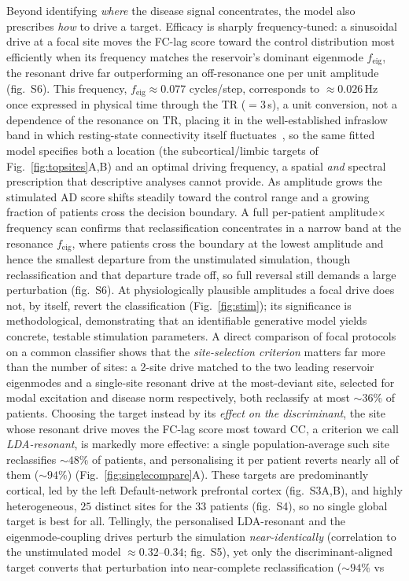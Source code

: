 \documentclass[11pt]{article}
\begin{document}
Beyond identifying \emph{where} the disease signal concentrates, the model also
prescribes \emph{how} to drive a target. Efficacy is sharply frequency-tuned: a
sinusoidal drive at a focal site moves the FC-lag score toward the control
distribution most efficiently when its frequency matches the reservoir's dominant
eigenmode $f_{\mathrm{eig}}$, the resonant drive far outperforming an off-resonance
one per unit amplitude (fig.~S6). This frequency, $f_{\mathrm{eig}}\approx0.077$
cycles/step, corresponds to $\approx0.026$\,Hz once expressed in physical time
through the TR ($=3$\,s), a unit conversion, not a dependence of the resonance on
TR, placing it in the well-established infraslow band in which resting-state
connectivity itself
fluctuates~\cite{fox2007,cordes2001,diantonio2026}, so the same fitted model
specifies both a location
(the subcortical/limbic targets of Fig.~\ref{fig:topsites}A,B) and an optimal driving
frequency, a spatial \emph{and} spectral prescription that descriptive analyses
cannot provide. As amplitude grows
the stimulated AD score shifts steadily toward the control range and a growing
fraction of patients cross the decision boundary. A full per-patient
amplitude$\times$frequency scan confirms that reclassification concentrates in a
narrow band at the resonance $f_{\mathrm{eig}}$, where patients cross the boundary
at the lowest amplitude and hence the smallest departure from the unstimulated
simulation, though reclassification and that departure trade off, so full reversal
still demands a large perturbation (fig.~S6). At
physiologically plausible amplitudes a focal drive does not, by itself, revert the
classification (Fig.~\ref{fig:stim}); its significance is methodological, demonstrating that an
identifiable generative model yields concrete, testable stimulation parameters. A
direct comparison of focal protocols on a common classifier shows that the
\emph{site-selection criterion} matters far more than the number of sites: a
2-site drive matched to the two leading reservoir eigenmodes and a single-site
resonant drive at the most-deviant site, selected for modal excitation and
disease norm respectively, both reclassify at most $\sim$$36\%$ of patients.
Choosing the target instead by its \emph{effect on the discriminant}, the site
whose resonant drive moves the FC-lag score most toward CC, a criterion we call
\emph{LDA-resonant}, is markedly more effective: a single population-average such
site reclassifies $\sim$$48\%$ of patients, and personalising it per patient
reverts nearly all of them ($\sim$$94\%$) (Fig.~\ref{fig:singlecompare}A). These targets
are predominantly cortical, led by the left Default-network prefrontal cortex
(fig.~S3A,B), and highly heterogeneous, $25$ distinct sites for the $33$ patients
(fig.~S4), so no single global target is best for all. Tellingly, the
personalised LDA-resonant and the eigenmode-coupling drives perturb the
simulation \emph{near-identically} (correlation to the unstimulated model
$\approx0.32$--$0.34$; fig.~S5), yet only the discriminant-aligned target
converts that perturbation into near-complete reclassification ($\sim$$94\%$ vs
\end{document}
